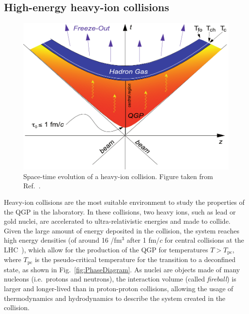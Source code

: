 \subsection{High-energy heavy-ion collisions}
\begin{figure}[t]
  \centering
  \includegraphics[width=0.7\linewidth]{Figures/Chapter 1/Bild_18.pdf}
  \caption{Space-time evolution of a heavy-ion collision. Figure taken from Ref.~\cite{Stock:2008ru}.}
  \label{fig:HeavyIonCollisions}
\end{figure}
Heavy-ion collisions are the most suitable environment to study the properties of the QGP in the laboratory. In these collisions, two heavy ions, such as lead or gold nuclei, are accelerated to ultra-relativistic energies and made to collide. Given the large amount of energy deposited in the collision, the system reaches high energy densities (of around 16 \gev/fm$^3$ after 1 fm/$c$ for central collisions at the LHC~\cite{Loizides:2011ys}), which allow for the production of the QGP for temperatures $T>T_\mathrm{pc}$, where $T_\mathrm{pc}$ is the pseudo-critical temperature for the transition to a deconfined state, as shown in Fig.~\ref{fig:PhaseDiagram}. As nuclei are objects made of many nucleons (i.e.\ protons and neutrons), the interaction volume (called \emph{fireball}) is larger and longer-lived than in proton-proton collisions, allowing the usage of thermodynamics and hydrodynamics to describe the system created in the collision. 

